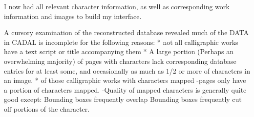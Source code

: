                 
                I now had all relevant character information, as well as corresponding work information and images to build my interface.
                
    A cursory examination of the reconstructed database revealed much of the DATA in CADAL is incomplete for the following reasons:
        * not all calligraphic works have a text script or title accompanying them
        * A large portion (Perhaps an overwhelming majority) of pages with characters lack corresponding database entries for at least some, and occasionally as much as 1/2 or more of characters in an image.
        * of those calligraphic works with characters mapped
            -pages only have a portion of characters mapped.
            -Quality of mapped characters is generally quite good except:
                Bounding boxes frequently overlap
                Bounding boxes frequently cut off portions of the character.                
                
